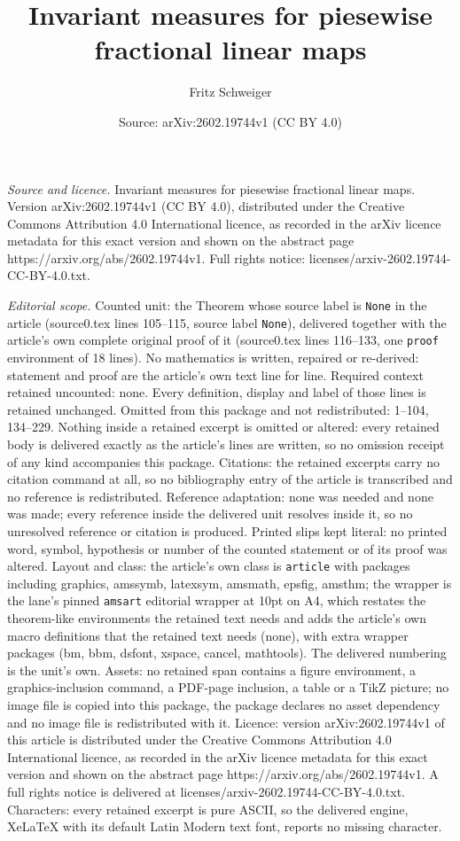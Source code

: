 \documentclass[10pt,a4paper]{amsart}
\title[Invariant measures for piesewise fractional linear maps]{Invariant measures for piesewise fractional linear maps}
\author{Fritz Schweiger}
\date{Source: arXiv:2602.19744v1 (CC BY 4.0)}
\begin{document}
\maketitle

\noindent\emph{Source and licence.} Invariant measures for piesewise fractional linear maps. Version arXiv:2602.19744v1 (CC BY 4.0), distributed under the Creative Commons Attribution 4.0 International licence, as recorded in the arXiv licence metadata for this exact version and shown on the abstract page https://arxiv.org/abs/2602.19744v1. Full rights notice: licenses/arxiv-2602.19744-CC-BY-4.0.txt.\par\smallskip

\noindent\textit{Editorial scope.} Counted unit: the Theorem whose source label is \texttt{None} in the article (source0.tex lines 105--115, source label \texttt{None}), delivered together with the article's own complete original proof of it (source0.tex lines 116--133, one \texttt{proof} environment of 18 lines). No mathematics is written, repaired or re-derived: statement and proof are the article's own text line for line. Required context retained uncounted: none. Every definition, display and label of those lines is retained unchanged. Omitted from this package and not redistributed: 1--104, 134--229. Nothing inside a retained excerpt is omitted or altered: every retained body is delivered exactly as the article's lines are written, so no omission receipt of any kind accompanies this package. Citations: the retained excerpts carry no citation command at all, so no bibliography entry of the article is transcribed and no reference is redistributed. Reference adaptation: none was needed and none was made; every reference inside the delivered unit resolves inside it, so no unresolved reference or citation is produced. Printed slips kept literal: no printed word, symbol, hypothesis or number of the counted statement or of its proof was altered. Layout and class: the article's own class is \texttt{article} with packages including graphics, amssymb, latexsym, amsmath, epsfig, amsthm; the wrapper is the lane's pinned \texttt{amsart} editorial wrapper at 10pt on A4, which restates the theorem-like environments the retained text needs and adds the article's own macro definitions that the retained text needs (none), with extra wrapper packages (bm, bbm, dsfont, xspace, cancel, mathtools). The delivered numbering is the unit's own. Assets: no retained span contains a figure environment, a graphics-inclusion command, a PDF-page inclusion, a table or a TikZ picture; no image file is copied into this package, the package declares no asset dependency and no image file is redistributed with it. Licence: version arXiv:2602.19744v1 of this article is distributed under the Creative Commons Attribution 4.0 International licence, as recorded in the arXiv licence metadata for this exact version and shown on the abstract page https://arxiv.org/abs/2602.19744v1. A full rights notice is delivered at licenses/arxiv-2602.19744-CC-BY-4.0.txt. Characters: every retained excerpt is pure ASCII, so the delivered engine, XeLaTeX with its default Latin Modern text font, reports no missing character.
\end{document}
